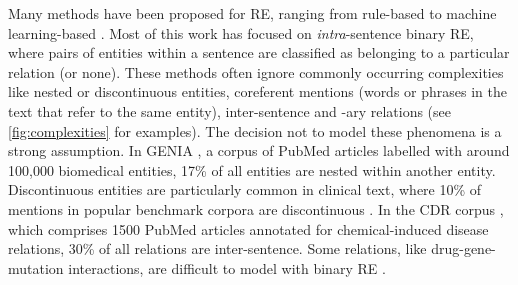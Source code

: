 \documentclass[11pt]{article}
\begin{document}
Many methods have been proposed for RE, ranging from rule-based to machine learning-based \citep{zhou2014biomedical, DBLP:journals/corr/LiuCJY16}. Most of this work has focused on \textit{intra}-sentence binary RE, where pairs of entities within a sentence are classified as belonging to a particular relation (or none). These methods often ignore commonly occurring complexities like nested or discontinuous entities, coreferent mentions (words or phrases in the text that refer to the same entity), inter-sentence and -ary relations (see \autoref{fig:complexities} for examples). The decision not to model these phenomena is a strong assumption. In GENIA \citep{Kim2003GENIAC}, a corpus of PubMed articles labelled with around 100,000 biomedical entities, 17\% of all entities are nested within another entity. Discontinuous entities are particularly common in clinical text, where 10\% of mentions in popular benchmark corpora are discontinuous \citep{wang-etal-2021-discontinuous}. In the CDR corpus \citep{li2016biocreative}, which comprises 1500 PubMed articles annotated for chemical-induced disease relations, 30\% of all relations are inter-sentence. Some relations, like drug-gene-mutation interactions, are difficult to model with binary RE \citep{zhou2014biomedical}.
\end{document}
